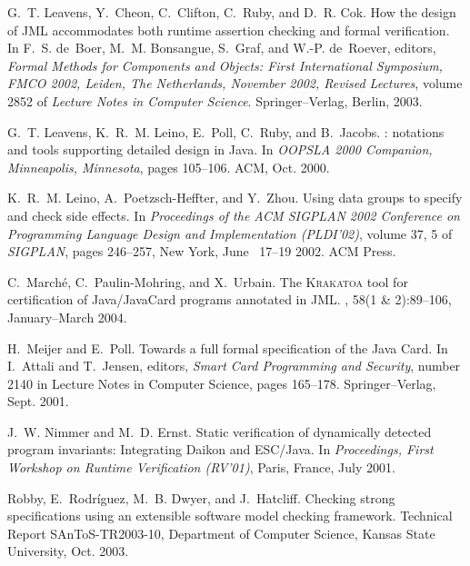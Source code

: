 \documentclass{sig-alternate}
\begin{document}
\begin{thebibliography}{10}
G.~T. Leavens, Y.~Cheon, C.~Clifton, C.~Ruby, and D.~R. Cok.
\newblock How the design of {JML} accommodates both runtime assertion checking
  and formal verification.
\newblock In F.~S. de~Boer, M.~M. Bonsangue, S.~Graf, and W.-P. de~Roever,
  editors, {\em Formal Methods for Components and Objects: First International
  Symposium, FMCO 2002, Leiden, The Netherlands, November 2002, Revised
  Lectures}, volume 2852 of {\em Lecture Notes in Computer Science}.
  Springer--Verlag, Berlin, 2003.

G.~T. Leavens, K.~R.~M. Leino, E.~Poll, C.~Ruby, and B.~Jacobs.
: notations and tools supporting detailed design in {Java}.
\newblock In {\em OOPSLA 2000 Companion, Minneapolis, Minnesota}, pages
  105--106. ACM, Oct. 2000.

K.~R.~M. Leino, A.~Poetzsch-Heffter, and Y.~Zhou.
\newblock Using data groups to specify and check side effects.
\newblock In {\em Proceedings of the {ACM} {SIGPLAN} 2002 Conference on
  Programming Language Design and Implementation ({PLDI}'02)}, volume 37, 5 of
  {\em SIGPLAN}, pages 246--257, New York, June ~17--19 2002. ACM Press.

C.~March{\'e}, C.~Paulin-Mohring, and X.~Urbain.
\newblock The \textsc{Krakatoa} tool for certification of {Java/JavaCard}
  programs annotated in {JML}.
, 58(1 \& 2):89--106,
  January--March 2004.

H.~Meijer and E.~Poll.
\newblock Towards a full formal specification of the {Java Card}.
\newblock In I.~Attali and T.~Jensen, editors, {\em Smart Card Programming and
  Security}, number 2140 in Lecture Notes in Computer Science, pages 165--178.
  Springer--Verlag, Sept. 2001.

J.~W. Nimmer and M.~D. Ernst.
\newblock Static verification of dynamically detected program invariants:
  Integrating {Daikon} and {ESC/Java}.
\newblock In {\em Proceedings, First Workshop on Runtime Verification (RV'01)},
  Paris, France, July 2001.

Robby, E.~Rodr\'{i}guez, M.~B. Dwyer, and J.~Hatcliff.
\newblock Checking strong specifications using an extensible software model
  checking framework.
\newblock Technical Report {SAnToS-TR2003-10}, Department of Computer Science,
  Kansas State University, Oct. 2003.

\end{thebibliography}
\end{document}
